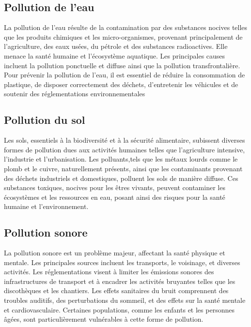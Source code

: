 \documentclass{report}
\begin{document}
\subsection{Pollution de l'eau}
 La pollution de l'eau résulte de la contamination par des substances nocives telles que les produits chimiques et les micro-organismes, provenant principalement de l'agriculture, des eaux usées, du pétrole et des substances radioactives. Elle menace la santé humaine et l'écosystème aquatique.
 Les principales causes incluent la pollution ponctuelle et diffuse ainsi que la pollution transfrontalière. Pour prévenir la pollution de l'eau, il est essentiel de réduire la consommation de plastique, de disposer correctement des déchets, d'entretenir les véhicules et de soutenir des réglementations environnementales \cite{web 1: www.nrdc.org}

\subsection{Pollution du sol}
  Les sols, essentiels à la biodiversité et à la sécurité alimentaire, subissent diverses formes de pollution dues aux activités humaines telles que l'agriculture intensive, l'industrie et l'urbanisation.
Les polluants,tels que les métaux lourds comme le plomb et le cuivre, naturellement présents, ainsi que les contaminants provenant des déchets industriels et domestiques, polluent les sols de manière diffuse. 
Ces substances toxiques, nocives pour les êtres vivants, peuvent contaminer les écosystèmes et les ressources en eau, posant ainsi des risques pour la santé humaine et l'environnement.
 \cite{web 2 : www.notre-environnement.gouv.fr}
 \subsection{Pollution sonore}
La pollution sonore est un problème majeur, affectant la santé physique et mentale. Les principales sources incluent les transports, le voisinage, et diverses activités. Les réglementations visent à limiter les émissions sonores des infrastructures de transport et à encadrer les activités bruyantes telles que les discothèques et les chantiers. 
Les effets sanitaires du bruit comprennent des troubles auditifs, des perturbations du sommeil, et des effets sur la santé mentale et cardiovasculaire. Certaines populations, comme les enfants et les personnes âgées, sont particulièrement vulnérables à cette forme de pollution.

 \cite{web 3 : www.ecologie.gouv.fr}
\end{document}

